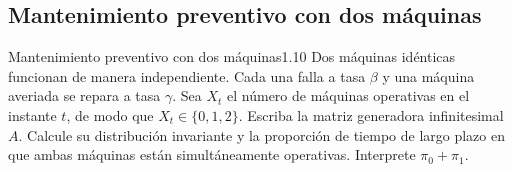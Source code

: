 \documentclass[10pt,a4paper]{article}
\begin{document}
\newpage 
\subsection{Mantenimiento preventivo con dos máquinas}


\begin{ejercicio}{Mantenimiento preventivo con dos máquinas}{1.10}
    Dos máquinas idénticas funcionan de manera independiente. 
    Cada una falla a tasa $\beta$ y una máquina averiada se repara a tasa $\gamma$. Sea $X_t$ el número de máquinas operativas en el instante $t$, de modo que $X_t \in \{0,1,2\}$. Escriba la matriz generadora infinitesimal $A$. Calcule su distribución invariante y la proporción de tiempo de largo plazo en que ambas máquinas están simultáneamente operativas. Interprete $\pi_0 + \pi_1$.
\end{ejercicio}
\end{document}
